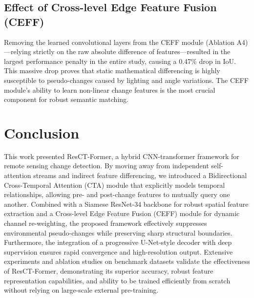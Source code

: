 \documentclass[conference]{IEEEtran}
\begin{document}
\subsection{Effect of Cross-level Edge Feature Fusion (CEFF)}
Removing the learned convolutional layers from the CEFF module (Ablation A4)—relying strictly on the raw absolute difference of features—resulted in the largest performance penalty in the entire study, causing a 0.47\% drop in IoU. This massive drop proves that static mathematical differencing is highly susceptible to pseudo-changes caused by lighting and angle variations. The CEFF module's ability to learn non-linear change features is the most crucial component for robust semantic matching.

\section{Conclusion}

This work presented ResCT-Former, a hybrid CNN-transformer framework for remote sensing change detection. By moving away from independent self-attention streams and indirect feature differencing, we introduced a Bidirectional Cross-Temporal Attention (CTA) module that explicitly models temporal relationships, allowing pre- and post-change features to mutually query one another. Combined with a Siamese ResNet-34 backbone for robust spatial feature extraction and a Cross-level Edge Feature Fusion (CEFF) module for dynamic channel re-weighting, the proposed framework effectively suppresses environmental pseudo-changes while preserving sharp structural boundaries. Furthermore, the integration of a progressive U-Net-style decoder with deep supervision ensures rapid convergence and high-resolution output. Extensive experiments and ablation studies on benchmark datasets validate the effectiveness of ResCT-Former, demonstrating its superior accuracy, robust feature representation capabilities, and ability to be trained efficiently from scratch without relying on large-scale external pre-training.



\end{document}
